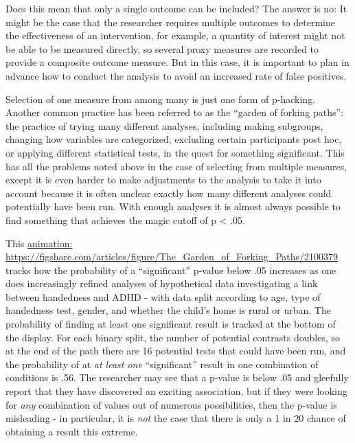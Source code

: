 \documentclass{krantz}
\begin{document}
Does this mean that only a single outcome can be included? The answer is no: It might be the case that the researcher requires multiple outcomes to determine the effectiveness of an intervention, for example, a quantity of interest might not be able to be measured directly, so several proxy measures are recorded to provide a composite outcome measure. But in this case, it is important to plan in advance how to conduct the analysis to avoid an increased rate of false positives.

Selection of one measure from among many is just one form of p-hacking. Another common practice has been referred to as the ``garden of forking paths'': the practice of trying many different analyses, including making subgroups, changing how variables are categorized, excluding certain participants post hoc, or applying different statistical tests, in the quest for something significant. This has all the problems noted above in the case of selecting from multiple measures, except it is even harder to make adjustments to the analysis to take it into account because it is often unclear exactly how many different analyses could potentially have been run. With enough analyses it is almost always possible to find something that achieves the magic cutoff of p \textless{} .05.

This \href{https://figshare.com/articles/figure/The_Garden_of_Forking_Paths/2100379}{animation: https://figshare.com/articles/figure/The\_Garden\_of\_Forking\_Paths/2100379} tracks how the probability of a ``significant'' p-value below .05 increases as one does increasingly refined analyses of hypothetical data investigating a link between handedness and ADHD - with data split according to age, type of handedness test, gender, and whether the child's home is rural or urban. The probability of finding at least one significant result is tracked at the bottom of the display. For each binary split, the number of potential contrasts doubles, so at the end of the path there are 16 potential tests that could have been run, and the probability of at \emph{at least one} ``significant'' result in one combination of conditions is .56. The researcher may see that a p-value is below .05 and gleefully report that they have discovered an exciting association, but if they were looking for \emph{any} combination of values out of numerous possibilities, then the p-value is misleading - in particular, it is \emph{not} the case that there is only a 1 in 20 chance of obtaining a result this extreme.
\end{document}

